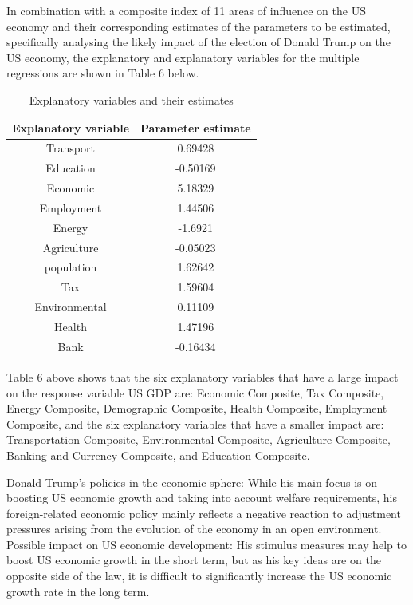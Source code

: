 \documentclass{apmcmthesis}
\begin{document}
In combination with a composite index of 11 areas of influence on the US economy and their corresponding estimates of the parameters to be estimated, specifically analysing the likely impact of the election of Donald Trump on the US economy, the explanatory and explanatory variables for the multiple regressions are shown in Table 6 below.
\begin{table}[H]
	\caption{Explanatory variables and their estimates}\label{tab:105} \centering
	\begin{tabular}{cc}
		\toprule[1.5pt]
	Explanatory variable & Parameter estimate \\
		\midrule[1pt]
		Transport            & 0.69428            \\
		Education            & -0.50169           \\
		Economic             & 5.18329            \\
		Employment           & 1.44506            \\
		Energy               & -1.6921            \\
		Agriculture          & -0.05023           \\
		population           & 1.62642            \\
		Tax                  & 1.59604            \\
		Environmental        & 0.11109            \\
		Health               & 1.47196            \\
		Bank                 & -0.16434          \\
		\bottomrule[1.5pt]      
	\end{tabular}
\end{table}

Table 6 above shows that the six explanatory variables that have a large impact on the response variable US GDP are: Economic Composite, Tax Composite, Energy Composite, Demographic Composite, Health Composite, Employment Composite, and the six explanatory variables that have a smaller impact are: Transportation Composite, Environmental Composite, Agriculture Composite, Banking and Currency Composite, and Education Composite.

Donald Trump's policies in the economic sphere: While his main focus is on boosting US economic growth and taking into account welfare requirements, his foreign-related economic policy mainly reflects a negative reaction to adjustment pressures arising from the evolution of the economy in an open environment. Possible impact on US economic development: His stimulus measures may help to boost US economic growth in the short term, but as his key ideas are on the opposite side of the law, it is difficult to significantly increase the US economic growth rate in the long term.
\end{document}
